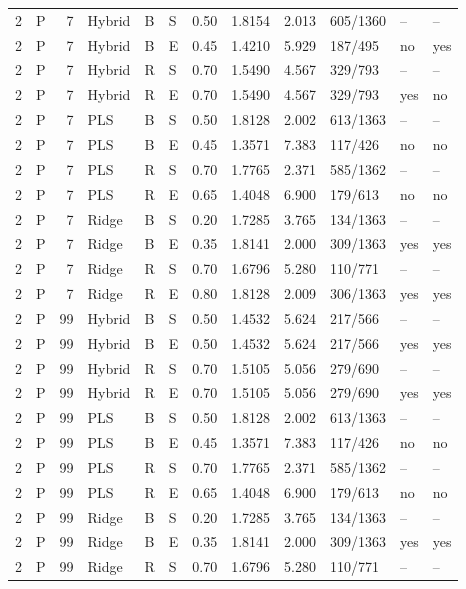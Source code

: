 \documentclass[10pt,a4paper]{article}
\begin{document}
\begin{landscape}
\begin{longtable}{rlrlllrrrlll}
2 & P & 7 & Hybrid & B & S & 0.50 & 1.8154 & 2.013 & 605/1360 & -- & -- \\
2 & P & 7 & Hybrid & B & E & 0.45 & 1.4210 & 5.929 & 187/495 & no & yes \\
2 & P & 7 & Hybrid & R & S & 0.70 & 1.5490 & 4.567 & 329/793 & -- & -- \\
2 & P & 7 & Hybrid & R & E & 0.70 & 1.5490 & 4.567 & 329/793 & yes & no \\
2 & P & 7 & PLS & B & S & 0.50 & 1.8128 & 2.002 & 613/1363 & -- & -- \\
2 & P & 7 & PLS & B & E & 0.45 & 1.3571 & 7.383 & 117/426 & no & no \\
2 & P & 7 & PLS & R & S & 0.70 & 1.7765 & 2.371 & 585/1362 & -- & -- \\
2 & P & 7 & PLS & R & E & 0.65 & 1.4048 & 6.900 & 179/613 & no & no \\
2 & P & 7 & Ridge & B & S & 0.20 & 1.7285 & 3.765 & 134/1363 & -- & -- \\
2 & P & 7 & Ridge & B & E & 0.35 & 1.8141 & 2.000 & 309/1363 & yes & yes \\
2 & P & 7 & Ridge & R & S & 0.70 & 1.6796 & 5.280 & 110/771 & -- & -- \\
2 & P & 7 & Ridge & R & E & 0.80 & 1.8128 & 2.009 & 306/1363 & yes & yes \\
2 & P & 99 & Hybrid & B & S & 0.50 & 1.4532 & 5.624 & 217/566 & -- & -- \\
2 & P & 99 & Hybrid & B & E & 0.50 & 1.4532 & 5.624 & 217/566 & yes & yes \\
2 & P & 99 & Hybrid & R & S & 0.70 & 1.5105 & 5.056 & 279/690 & -- & -- \\
2 & P & 99 & Hybrid & R & E & 0.70 & 1.5105 & 5.056 & 279/690 & yes & yes \\
2 & P & 99 & PLS & B & S & 0.50 & 1.8128 & 2.002 & 613/1363 & -- & -- \\
2 & P & 99 & PLS & B & E & 0.45 & 1.3571 & 7.383 & 117/426 & no & no \\
2 & P & 99 & PLS & R & S & 0.70 & 1.7765 & 2.371 & 585/1362 & -- & -- \\
2 & P & 99 & PLS & R & E & 0.65 & 1.4048 & 6.900 & 179/613 & no & no \\
2 & P & 99 & Ridge & B & S & 0.20 & 1.7285 & 3.765 & 134/1363 & -- & -- \\
2 & P & 99 & Ridge & B & E & 0.35 & 1.8141 & 2.000 & 309/1363 & yes & yes \\
2 & P & 99 & Ridge & R & S & 0.70 & 1.6796 & 5.280 & 110/771 & -- & -- \\

\end{longtable}
\end{landscape}
\end{document}
